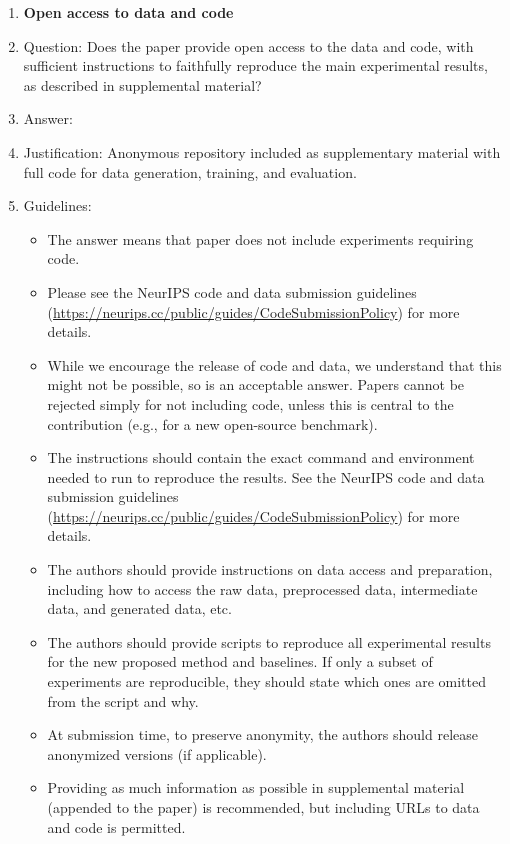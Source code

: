 \documentclass{article}
\begin{document}
\begin{enumerate}
\item {\bf Open access to data and code}
    \item[] Question: Does the paper provide open access to the data and code, with sufficient instructions to faithfully reproduce the main experimental results, as described in supplemental material?
    \item[] Answer: \answerYes{}
    \item[] Justification: Anonymous repository included as supplementary material with full code for data generation, training, and evaluation.
    \item[] Guidelines:
    \begin{itemize}
        \item The answer \answerNA{} means that paper does not include experiments requiring code.
        \item Please see the NeurIPS code and data submission guidelines (\url{https://neurips.cc/public/guides/CodeSubmissionPolicy}) for more details.
        \item While we encourage the release of code and data, we understand that this might not be possible, so \answerNo{} is an acceptable answer. Papers cannot be rejected simply for not including code, unless this is central to the contribution (e.g., for a new open-source benchmark).
        \item The instructions should contain the exact command and environment needed to run to reproduce the results. See the NeurIPS code and data submission guidelines (\url{https://neurips.cc/public/guides/CodeSubmissionPolicy}) for more details.
        \item The authors should provide instructions on data access and preparation, including how to access the raw data, preprocessed data, intermediate data, and generated data, etc.
        \item The authors should provide scripts to reproduce all experimental results for the new proposed method and baselines. If only a subset of experiments are reproducible, they should state which ones are omitted from the script and why.
        \item At submission time, to preserve anonymity, the authors should release anonymized versions (if applicable).
        \item Providing as much information as possible in supplemental material (appended to the paper) is recommended, but including URLs to data and code is permitted.
    \end{itemize}



\end{enumerate}
\end{document}

